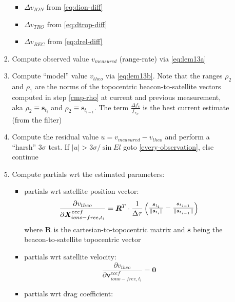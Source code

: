 \begin{enumerate}
\begin{enumerate}
\begin{enumerate}
\begin{itemize}
                \item $\Delta v_{ION}$ from \ref{eq:dion-diff}
                \item $\Delta v_{TRO}$ from \ref{eq:dtrop-diff}
                \item $\Delta v_{REC}$ from \ref{eq:drel-diff}
              \end{itemize}
            \item Compute observed value $v_{measured}$ (range-rate) via \ref{eq:lem13a}
            \item Compute ``model'' value $v_{theo}$ via \ref{eq:lem13b}. Note that the ranges $\rho _2$ and 
              $\rho _1$ are the norms of the topocentric beacon-to-satellite vectors computed in 
              step \ref{cmp-rho} at current and previous measurement, aka $\rho _2 \equiv \bm{s}_{t_i}$ 
              and $\rho _2 \equiv \bm{s}_{t_{i-1}}$. The term $\frac{\Delta f_e}{f_{e_N}}$ is the 
              best current estimate (from the filter)
            \item Compute the residual value $u = v_{measured} - v_{theo}$ and 
              perform a ``harsh'' $3\sigma$ test. If $ |u| > 3 \sigma / \sin{El}$ 
              goto \ref{every-observation}, else continue
            \item Compute partials wrt the estimated parameters:
              \begin{itemize}
                \item partials wrt satellite position vector: 
                \begin{equation} 
                  \frac{\partial v_{theo}}{\partial \bm{X}^{ecef}_{iono-free,t_i}} = 
                    \bm{R}^T \cdot \frac{1}{\Delta \tau} \begin{pmatrix} 
                      \frac{\bm{s}_{t_i}}{\lVert\bm{s}_{t_i}\rVert} - \frac{\bm{s}_{t_{i-1}}}{\lVert\bm{s}_{t_{i-1}}\rVert}
                      \end{pmatrix}
                \end{equation}
                where $\bm{R}$ is the cartesian-to-topocentric matrix and $\bm{s}$ being the 
                beacon-to-satellite topocentric vector
                \item partials wrt satellite velocity: 
                \begin{equation} 
                  \frac{\partial v_{theo}}{\partial \bm{v}^{ecef}_{iono-free,t_i}} = \bm{0}
                \end{equation}
                \item partials wrt drag coefficient:

\end{itemize}
\end{enumerate}
\end{enumerate}
\end{enumerate}
